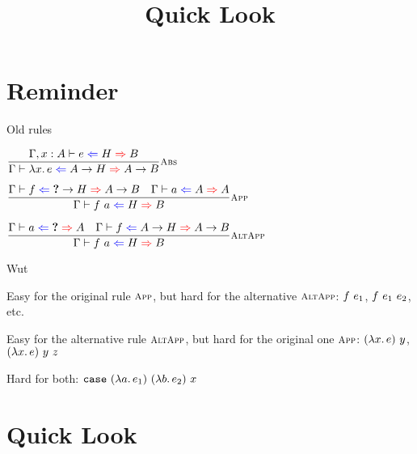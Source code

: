\documentclass{beamer}
\title{Quick Look}
\date{}
\begin{document}
\frame{\titlepage}

\section{Reminder}

\begin{frame}{Old rules}

\begin{center}
  $\infrule[Abs]{\fullhinting{\extend{\Gamma}{x}{A}}{e}{H}{B}}{\hinting{\fun{x}{e}}{\Fun{A}{H}}{\Fun{A}{B}}}$

  \vspace{2em}

  $\infrule[App]{\hinting{f}{\Fun{\Hole}{H}}{\Fun{A}{B}} \quad \hinting{a}{A}{A}}{\hinting{\app{f}{a}}{H}{B}}$

  \vspace{2em}

  $\infrule[AltApp]{\hinting{a}{\Hole}{A} \quad \hinting{f}{\Fun{A}{H}}{\Fun{A}{B}}}{\hinting{\app{f}{a}}{H}{B}}$
\end{center}

\end{frame}

\newcommand{\funcase}{\texttt{case}}

\begin{frame}{Wut}

Easy for the original rule $\textsc{\footnotesize{App}}$, but hard for the alternative $\textsc{\footnotesize{AltApp}}$: $f\ e_1$, $f\ e_1\ e_2$, etc.

\vspace{2em}

Easy for the alternative rule $\textsc{\footnotesize{AltApp}}$, but hard for the original one $\textsc{\footnotesize{App}}$: $(\lambda x.\, e)\ y$, $(\lambda x.\, e)\ y\ z$

\vspace{2em}

Hard for both: $\app{\app{\app{\app{\funcase}{(\fun{a}{e_1})}}{(\fun{b}{e_2})}}{x}}{}$
\end{frame}

\section{Quick Look}

\newcommand{\fullquicklookinfer}[3]{#1 \vdash #2 \mathcolor{green}{\Rightarrow} #3}
\newcommand{\quicklookinfer}[2]{\fullquicklookinfer{\Gamma}{#1}{#2}}
\end{document}
